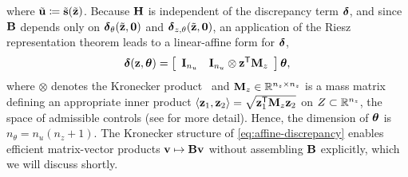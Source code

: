 where $\tilde{\mathbf{u}} \coloneqq \tilde{\mathbf{s}}(\tilde{\mathbf{z}})$.
%
Because $\mathbf{H}$ is independent of the discrepancy term $\boldsymbol{\delta}$, and since $\mathbf{B}$ depends only on $\boldsymbol{\delta}_\theta(\tilde{\mathbf{z}},\mathbf{0})$ and $\boldsymbol{\delta}_{z,\theta}(\tilde{\mathbf{z}},\mathbf{0})$, an application of the Riesz representation theorem leads to a linear-affine form for $\boldsymbol{\delta}$,
\begin{align}
    \label{eq:affine-discrepancy}
    \boldsymbol{\delta}(\mathbf{z},\boldsymbol{\theta}) = \left[\begin{array}{cc}
        \mathbf{I}_{n_u} & \mathbf{I}_{n_u}\otimes\mathbf{z}^{\mathsf{T}}\mathbf{M}_z
    \end{array}\right]\boldsymbol{\theta},
\end{align}
where $\otimes$ denotes the Kronecker product~\cite{vanloan2000kronecker} and $\mathbf{M}_z\in\mathbb{R}^{n_z\times n_z}$ is a mass matrix defining an appropriate inner product $\langle\mathbf{z}_1,\mathbf{z}_2\rangle = \sqrt{\mathbf{z}_1^{\mathsf{T}}\mathbf{M}_z\mathbf{z}_2}$ on $Z\subset\mathbb{R}^{n_z}$, the space of admissible controls (see \cite{hart2023hdsaoptimal} for more detail).
Hence, the dimension of $\boldsymbol{\theta}$ is $n_\theta = n_u(n_z + 1)$.
The Kronecker structure of \cref{eq:affine-discrepancy} enables efficient matrix-vector products $\mathbf{v}\mapsto\mathbf{B}\mathbf{v}$ without assembling $\mathbf{B}$ explicitly, which we will discuss shortly.

